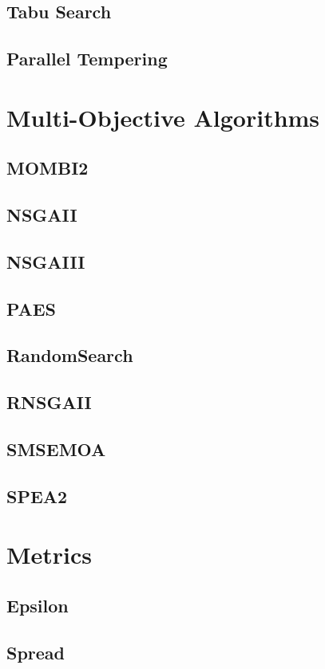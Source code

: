 \subsection{Tabu Search} 
\subsection{Parallel Tempering} 

\section{Multi-Objective Algorithms}

\subsection{MOMBI2}
\subsection{NSGAII}
\subsection{NSGAIII}
\subsection{PAES}
\subsection{RandomSearch}
\subsection{RNSGAII}
\subsection{SMSEMOA}
\subsection{SPEA2}

\section{Metrics}

\subsection{Epsilon}
\subsection{Spread}

